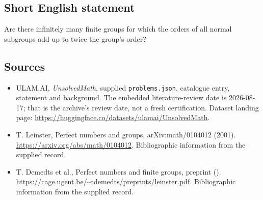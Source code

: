\documentclass[11pt,a4paper]{article}
\begin{document}
\subsection{Short English statement}

Are there infinitely many finite groups for which the orders of all normal subgroups add up to twice the group’s order?

\subsection{Sources}

{\small

\begin{itemize}

\item[\hypertarget{source:statement:1}{S1}] ULAM.AI, \emph{UnsolvedMath}, supplied \texttt{problems.json}, catalogue entry, statement and background. The embedded literature-review date is 2026-08-17; that is the archive’s review date, not a fresh certification. Dataset landing page: \url{https://huggingface.co/datasets/ulamai/UnsolvedMath}.

\item[\hypertarget{source:statement:2}{S2}] T. Leinster, Perfect numbers and groups, arXiv:math/0104012 (2001). \url{https://arxiv.org/abs/math/0104012}. Bibliographic information from the supplied record.

\item[\hypertarget{source:statement:3}{S3}] T. Demedts et al., Perfect numbers and finite groups, preprint (). \url{https://cage.ugent.be/~tdemedts/preprints/leinster.pdf}. Bibliographic information from the supplied record.

\end{itemize}

}

\label{end:statement}
\end{document}
